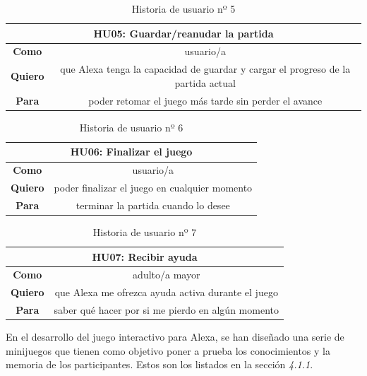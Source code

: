 \begin{table}[H]
    \centering
    \begin{tabular}{|c|c|}
        \hline
        \multicolumn{2}{|c|}{\textbf{HU05}: Guardar/reanudar la partida} \\
        \hline
        \textbf{Como} & usuario/a \\
        \hline
        \textbf{Quiero} & que Alexa tenga la capacidad de guardar y cargar el progreso de la partida actual \\
        \hline
        \textbf{Para} & poder retomar el juego más tarde sin perder el avance \\
        \hline
    \end{tabular}
    \caption{Historia de usuario nº 5}
    \label{tab:HU05}
\end{table}

\begin{table}[H]
    \centering
    \begin{tabular}{|c|c|}
        \hline
        \multicolumn{2}{|c|}{\textbf{HU06}: Finalizar el juego} \\
        \hline
        \textbf{Como} & usuario/a \\
        \hline
        \textbf{Quiero} & poder finalizar el juego en cualquier momento \\
        \hline
        \textbf{Para} & terminar la partida cuando lo desee \\
        \hline
    \end{tabular}
    \caption{Historia de usuario nº 6}
    \label{tab:HU06}
\end{table}

\begin{table}[H]
    \centering
    \begin{tabular}{|c|c|}
        \hline
        \multicolumn{2}{|c|}{\textbf{HU07}: Recibir ayuda} \\
        \hline
        \textbf{Como} & adulto/a mayor \\
        \hline
        \textbf{Quiero} & que Alexa me ofrezca ayuda activa durante el juego \\
        \hline
        \textbf{Para} & saber qué hacer por si me pierdo en algún momento \\
        \hline
    \end{tabular}
    \caption{Historia de usuario nº 7}
    \label{tab:HU07}
\end{table}

En el desarrollo del juego interactivo para Alexa, se han diseñado una serie de minijuegos que tienen como objetivo poner a prueba los conocimientos y la memoria de los participantes. Estos son los listados en la sección \textit{4.1.1}. 

